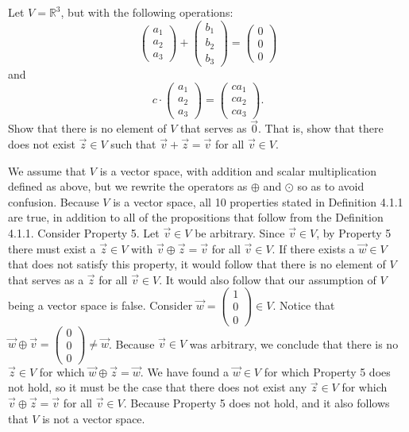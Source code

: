\documentclass[12pt]{article}
\newenvironment{problem}[2][Problem]
{
	\begin{trivlist} 
		\item[\hskip \labelsep {\bfseries #1 #2:}]
	}
{
	\end{trivlist}
	}
\newenvironment{solution}[1][Solution]
{
	\begin{trivlist} 
		\item[\hskip \labelsep {\itshape #1:}]
	}
	{
	\end{trivlist}
}
\begin{document}
\begin{problem}{1}
Let $V=\mathbb{R}^3$, but with the following operations:
\[
\begin{pmatrix}a_1\\a_2\\a_3\end{pmatrix} + \begin{pmatrix}b_1\\b_2\\b_3\end{pmatrix} = \begin{pmatrix}0\\0\\0\end{pmatrix}  
\]
and
\[
c\cdot \begin{pmatrix}a_1\\a_2\\a_3\end{pmatrix}  = \begin{pmatrix}ca_1\\ca_2\\ca_3\end{pmatrix} \text{.}
\]
Show that there is no element of $V$ that serves as $\vec{0}$. That is, show that there does not exist $\vec{z}\in V$ such that $\vec{v} + \vec{z} = \vec{v}$ for all $\vec{v}\in V$.
\noindent
\newline
\newline
\begin{solution}
We assume that $V$ is a vector space, with addition and scalar multiplication defined as above, but we rewrite the operators as $\oplus$ and $\odot$ so as to avoid confusion. Because $V$ is a vector space, all 10 properties stated in Definition 4.1.1 are true, in addition to all of the propositions that follow from the Definition 4.1.1. Consider Property 5. Let $\vec{v} \in V$ be arbitrary. Since $\vec{v}\in V$, by Property 5 there must exist a $\vec{z} \in V$ with $\vec{v} \oplus \vec{z} = \vec{v}$ for all $\vec{v}\in V$. 
If there exists a $\vec{w} \in V$ that does not satisfy this property, it would follow that there is no element of $V$ that serves as a $\vec{z}$ for all $\vec{v} \in V$. It would also follow that our assumption of $V$ being a vector space is false.
Consider $\vec{w} = \begin{pmatrix}1\\0\\0\end{pmatrix} \in V$. Notice that $\vec{w} \oplus \vec{v} = \begin{pmatrix}0\\0\\0\end{pmatrix} \neq \vec{w}$. Because $\vec{v} \in V$ was arbitrary, we conclude that there is no $\vec{z} \in V$ for which $\vec{w} \oplus \vec{z} = \vec{w}$. We have found a $\vec{w} \in V$ for which Property 5 does not hold, so it must be the case that there does not exist any $\vec{z} \in V$ for which $\vec{v} \oplus \vec{z} = \vec{v}$ for all $\vec{v}\in V$. Because Property 5 does not hold, and it also follows that $V$ is not a vector space. 

\end{solution}
\end{problem}
\end{document}

